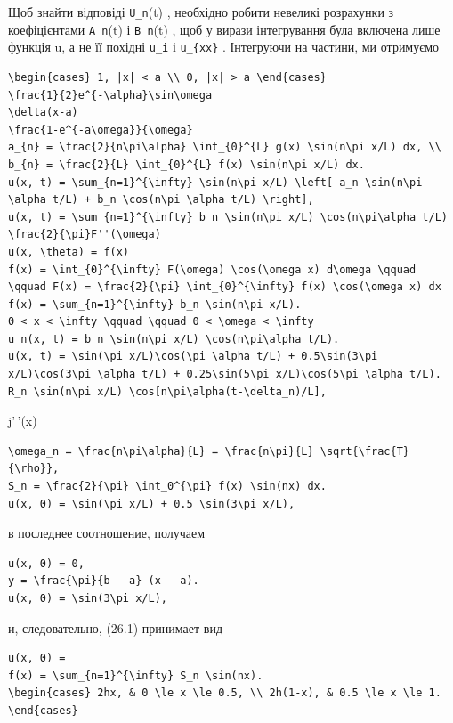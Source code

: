 \documentclass[
  ukrainian,
]{article}
\begin{document}
Щоб знайти відповіді \texttt{U\_n}(t) , необхідно робити невеликі
розрахунки з коефіцієнтами \texttt{A\_n}(t) і \texttt{B\_n}(t) , щоб у
вирази інтегрування була включена лише функція u, а не її похідні
\texttt{u\_i} і \texttt{u\_\{xx\}} . Інтегруючи на частини, ми отримуємо

\begin{verbatim}
\begin{cases} 1, |x| < a \\ 0, |x| > a \end{cases}
\frac{1}{2}e^{-\alpha}\sin\omega
\delta(x-a)
\frac{1-e^{-a\omega}}{\omega}
a_{n} = \frac{2}{n\pi\alpha} \int_{0}^{L} g(x) \sin(n\pi x/L) dx, \\ b_{n} = \frac{2}{L} \int_{0}^{L} f(x) \sin(n\pi x/L) dx.
u(x, t) = \sum_{n=1}^{\infty} \sin(n\pi x/L) \left[ a_n \sin(n\pi \alpha t/L) + b_n \cos(n\pi \alpha t/L) \right],
u(x, t) = \sum_{n=1}^{\infty} b_n \sin(n\pi x/L) \cos(n\pi\alpha t/L)
\frac{2}{\pi}F''(\omega)
u(x, \theta) = f(x)
f(x) = \int_{0}^{\infty} F(\omega) \cos(\omega x) d\omega \qquad \qquad F(x) = \frac{2}{\pi} \int_{0}^{\infty} f(x) \cos(\omega x) dx
f(x) = \sum_{n=1}^{\infty} b_n \sin(n\pi x/L).
0 < x < \infty \qquad \qquad 0 < \omega < \infty
u_n(x, t) = b_n \sin(n\pi x/L) \cos(n\pi\alpha t/L).
u(x, t) = \sin(\pi x/L)\cos(\pi \alpha t/L) + 0.5\sin(3\pi x/L)\cos(3\pi \alpha t/L) + 0.25\sin(5\pi x/L)\cos(5\pi \alpha t/L).
R_n \sin(n\pi x/L) \cos[n\pi\alpha(t-\delta_n)/L],
\end{verbatim}

j'\,'(x)

\begin{verbatim}
\omega_n = \frac{n\pi\alpha}{L} = \frac{n\pi}{L} \sqrt{\frac{T}{\rho}},
S_n = \frac{2}{\pi} \int_0^{\pi} f(x) \sin(nx) dx.
u(x, 0) = \sin(\pi x/L) + 0.5 \sin(3\pi x/L),
\end{verbatim}

в последнее соотношение, получаем

\begin{verbatim}
u(x, 0) = 0,
y = \frac{\pi}{b - a} (x - a).
u(x, 0) = \sin(3\pi x/L),
\end{verbatim}

и, следовательно, (26.1) принимает вид

\begin{verbatim}
u(x, 0) =
f(x) = \sum_{n=1}^{\infty} S_n \sin(nx).
\begin{cases} 2hx, & 0 \le x \le 0.5, \\ 2h(1-x), & 0.5 \le x \le 1. \end{cases}
\end{verbatim}
\end{document}
